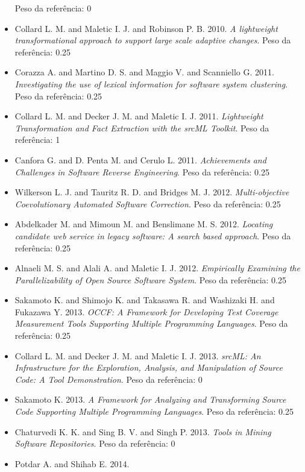 \begin{itemize}
      Peso da referência: 0
\item Collard L. M. and Maletic I. J. and Robinson P. B.
      2010.
      {\it A lightweight transformational approach to support large scale adaptive changes}.
      Peso da referência: 0.25
\item Corazza A. and Martino D. S. and Maggio V. and Scanniello G.
      2011.
      {\it Investigating the use of lexical information for software system clustering}.
      Peso da referência: 0.25
\item Collard L. M. and Decker J. M. and Maletic I. J.
      2011.
      {\it Lightweight Transformation and Fact Extraction with the srcML Toolkit}.
      Peso da referência: 1
\item Canfora G. and D. Penta M. and Cerulo L.
      2011.
      {\it Achievements and Challenges in Software Reverse Engineering}.
      Peso da referência: 0.25
\item Wilkerson L. J. and Tauritz R. D. and Bridges M. J.
      2012.
      {\it Multi-objective Coevolutionary Automated Software Correction}.
      Peso da referência: 0.25
\item Abdelkader M. and Mimoun M. and Benslimane M. S.
      2012.
      {\it Locating candidate web service in legacy software: A search based approach}.
      Peso da referência: 0.25
\item Alnaeli M. S. and Alali A. and Maletic I. J.
      2012.
      {\it Empirically Examining the Parallelizability of Open Source Software System}.
      Peso da referência: 0.25
\item Sakamoto K. and Shimojo K. and Takasawa R. and Washizaki H. and Fukazawa Y.
      2013.
      {\it OCCF: A Framework for Developing Test Coverage Measurement Tools Supporting Multiple Programming Languages}.
      Peso da referência: 0.25
\item Collard L. M. and Decker J. M. and Maletic I. J.
      2013.
      {\it srcML: An Infrastructure for the Exploration, Analysis, and Manipulation of Source Code: A Tool Demonstration}.
      Peso da referência: 0
\item Sakamoto K.
      2013.
      {\it A Framework for Analyzing and Transforming Source Code Supporting Multiple Programming Languages}.
      Peso da referência: 0.25
\item Chaturvedi K. K. and Sing B. V. and Singh P.
      2013.
      {\it Tools in Mining Software Repositories}.
      Peso da referência: 0
\item Potdar A. and Shihab E.
      2014.

\end{itemize}
